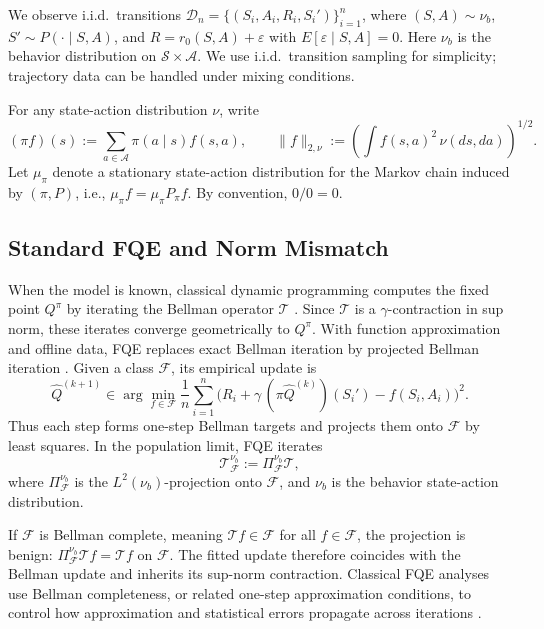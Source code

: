 \documentclass{article}
\theoremstyle{plain}
\theoremstyle{definition}
\theoremstyle{remark}
\begin{document}
We observe i.i.d.\ transitions
\(\mathcal D_n=\{(S_i,A_i,R_i,S_i')\}_{i=1}^n\), where
\((S,A)\sim\nu_b\), \(S'\sim P(\cdot\mid S,A)\), and
\(R=r_0(S,A)+\varepsilon\) with \(E[\varepsilon\mid S,A]=0\). Here \(\nu_b\) is
the behavior distribution on \(\mathcal S\times\mathcal A\). We use i.i.d.\
transition sampling for simplicity; trajectory data can be handled under mixing
conditions.

For any state-action distribution \(\nu\), write
\[
(\pi f)(s):=\sum_{a\in\mathcal A}\pi(a\mid s)f(s,a),
\qquad
\|f\|_{2,\nu}
:=
\left(\int f(s,a)^2\,\nu(ds,da)\right)^{1/2}.
\]
Let \(\mu_\pi  \) denote a stationary state-action distribution for the Markov
chain induced by \((\pi,P)\), i.e., $\mu_\pi f  = \mu_{\pi} P_{\pi} f$. By convention, \(0/0=0\).

\subsection{Standard FQE and Norm Mismatch}

When the model is known, classical dynamic programming computes the fixed point
\(Q^\pi\) by iterating the Bellman operator \(\mathcal T\)
\citep{bellman1952theory,bellman1966dynamic}. Since \(\mathcal T\) is a
\(\gamma\)-contraction in sup norm, these iterates converge geometrically to
\(Q^\pi\). With function approximation and offline data, FQE replaces exact
Bellman iteration by projected Bellman iteration
\citep{lagoudakis2003least,ernst2005tree,munos2008finite}. Given a class
\(\mathcal F\), its empirical update is
\[
\widehat{Q}^{(k+1)}
\in \arg\min_{f \in \mathcal F}
\frac{1}{n} \sum_{i=1}^n
\bigl(
  R_i + \gamma\,(\pi \widehat{Q}^{(k)})(S_i')
  - f(S_i,A_i)
\bigr)^2 .
\]
Thus each step forms one-step Bellman targets and projects them onto
\(\mathcal F\) by least squares. In the population limit, FQE iterates $$  \mathcal T_{\mathcal F}^{\nu_b}
    :=
    \Pi_{\mathcal F}^{\nu_b}\mathcal T,$$ where \(\Pi_{\mathcal F}^{\nu_b}\) is the \(L^2(\nu_b)\)-projection onto
\(\mathcal F\), and \(\nu_b\) is the behavior state-action distribution.

If \(\mathcal F\) is Bellman complete, meaning
\(\mathcal T f\in\mathcal F\) for all \(f\in\mathcal F\), the projection is
benign: \(\Pi_{\mathcal F}^{\nu_b}\mathcal T f=\mathcal T f\) on
\(\mathcal F\). The fitted update therefore coincides with the Bellman update
and inherits its sup-norm contraction. Classical FQE analyses use Bellman
completeness, or related one-step approximation conditions, to control how
approximation and statistical errors propagate across iterations
\citep{munos2008finite,chen2019information}.
\end{document}
